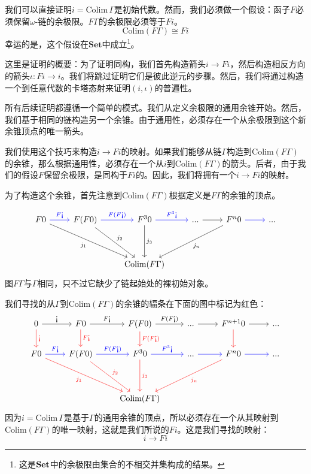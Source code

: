 \documentclass[DaoFP]{subfiles}
\begin{document}
 我们可以直接证明$i = \text{Colim}\, \Gamma$是初始代数。然而，我们必须做一个假设：函子$F$必须保留$\omega$-链的余极限。$F \Gamma$的余极限必须等于$F i$。
 \[ \text{Colim} (F \Gamma) \cong F i \]
 幸运的是，这个假设在$\mathbf{Set}$中成立\footnote{这是$\mathbf{Set}$中的余极限由集合的不相交并集构成的结果。}。

 这里是证明的概要：为了证明同构，我们首先构造箭头$i \to F i$，然后构造相反方向的箭头$\iota \colon F i \to i$。我们将跳过证明它们是彼此逆元的步骤。然后，我们将通过构造一个到任意代数的卡塔态射来证明$(i, \iota)$的普遍性。

 所有后续证明都遵循一个简单的模式。我们从定义余极限的通用余锥开始。然后，我们基于相同的链构造另一个余锥。由于通用性，必须存在一个从余极限到这个新余锥顶点的唯一箭头。

 我们使用这个技巧来构造$i \to F i$的映射。如果我们能够从链$\Gamma$构造到$\text{Colim} (F \Gamma)$的余锥，那么根据通用性，必须存在一个从$i$到$\text{Colim} (F \Gamma)$的箭头。后者，由于我们的假设$F$保留余极限，是同构于$F i$的。因此，我们将拥有一个$i \to F i$的映射。

 为了构造这个余锥，首先注意到$\text{Colim} (F \Gamma)$根据定义是$F \Gamma$的余锥的顶点。

 \[
  \begin{tikzcd}
   F 0
   \arrow[r, blue, "F \mbox{!`}"]
   \arrow[ddrr, "j_1"']
   &  F (F 0)
   \arrow[r, blue, "F(F  \mbox{!`})"]
   \arrow[ddr, "j_2"]
   & F^3 0
   \arrow[r, blue, "F^3\mbox{!`}"]
   \arrow[dd, "j_3"]
   & ...
   \arrow[r]
   & F^n 0
   \arrow[r, blue]
   \arrow[ddll, "j_n"]
   & ...
   \\
   \\
   &&\text{Colim} (F \Gamma)
  \end{tikzcd}
 \]
 图$F \Gamma$与$\Gamma$相同，只不过它缺少了链起始处的裸初始对象。

 我们寻找的从$\Gamma$到$\text{Colim} (F \Gamma)$的余锥的辐条在下面的图中标记为红色：
 \[
  \begin{tikzcd}
   0
   \arrow[r, "\mbox{!`}"]
   \arrow[d, red, "\mbox{!`}"]
   & F 0
   \arrow[r, "F\mbox{!`}"]
   \arrow[d, red, "F\mbox{!`}"]
   & F (F 0)
   \arrow[r, "F(F\mbox{!`})"]
   \arrow[d, red, "F(F\mbox{!`})"]
   & ...
   \arrow[r]
   & F^{n+1} 0
   \arrow[r]
   \arrow[d, red]
   & ...
   \\
   F 0
   \arrow[r, blue, "F \mbox{!`}"]
   \arrow[ddrr, red, "j_1"']
   &  F (F 0)
   \arrow[r, blue, "F(F  \mbox{!`})"]
   \arrow[ddr, red, "j_2"]
   & F^3 0
   \arrow[r, blue, "F^3\mbox{!`}"]
   \arrow[dd, red, "j_3"]
   & ...
   \arrow[r, blue]
   & F^n 0
   \arrow[r, blue]
   \arrow[ddll, red, "j_n"]
   & ...
   \\
   \\
   &&\text{Colim} (F \Gamma)
  \end{tikzcd}
 \]
 因为$i = \text{Colim}\, \Gamma$是基于$\Gamma$的通用余锥的顶点，所以必须存在一个从其映射到$\text{Colim} (F \Gamma)$的唯一映射，这就是我们所说的$F i$。这是我们寻找的映射：
 \[ i \to F i \]
\end{document}

